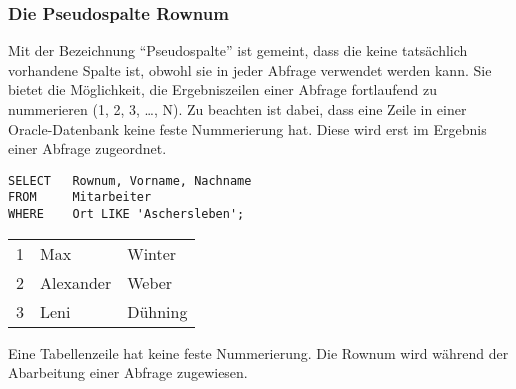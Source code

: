         \subsubsection{Die Pseudospalte Rownum}
          Mit der Bezeichnung \enquote{Pseudospalte} ist gemeint, dass die  keine tatsächlich vorhandene Spalte ist, obwohl sie in jeder Abfrage verwendet werden kann. Sie bietet die Möglichkeit, die Ergebniszeilen einer Abfrage fortlaufend zu nummerieren (1, 2, 3, \dots, N). Zu beachten ist dabei, dass eine Zeile in einer Oracle-Datenbank keine feste Nummerierung hat. Diese wird erst im Ergebnis einer Abfrage zugeordnet.
          \begin{lstlisting}[language=oracle_sql,caption={Ein einfaches Beispiel für die Rownum},label=sql06_11]
SELECT   Rownum, Vorname, Nachname
FROM     Mitarbeiter
WHERE    Ort LIKE 'Aschersleben';
          \end{lstlisting}
          \begin{center}
            \begin{small}
              \tablehead{}
              \tabletail {
              }

              \begin{oraclesql}
                \begin{supertabular}{rll}
                  1 & Max & Winter \\
                  2 & Alexander & Weber \\
                  3 & Leni & Dühning \\
                \end{supertabular}
              \end{oraclesql}
            \end{small}
          \end{center}
          \begin{merke}
            Eine Tabellenzeile hat keine feste Nummerierung. Die Rownum wird während der Abarbeitung einer Abfrage zugewiesen.
          \end{merke}
